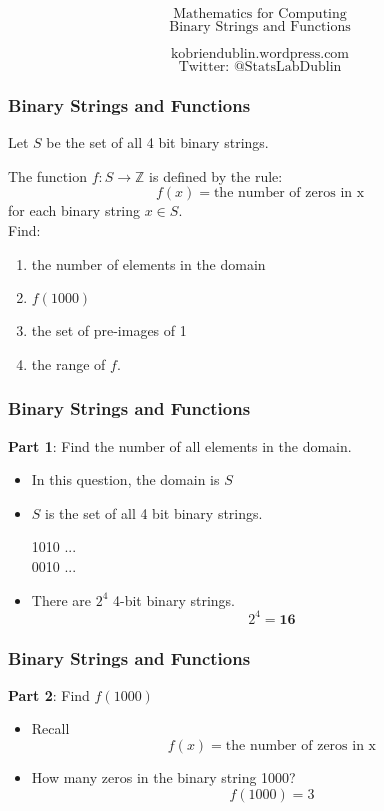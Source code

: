 \documentclass{beamer}
\begin{document}
\begin{frame}
\Huge
\[ \mbox{Mathematics for Computing} \]
\huge
\[ \mbox{Binary Strings and Functions} \]

\Large
\[ \mbox{kobriendublin.wordpress.com} \]
\[ \mbox{Twitter: @StatsLabDublin} \]

\end{frame}
\begin{frame}
\frametitle{Binary Strings and Functions}
\Large
Let $S$ be the set of all 4 bit binary strings. 

The function $f : S \rightarrow \mathbb{Z}$
is defined by the rule:
\[f(x) = \mbox{the number of zeros in x}\]
for each binary string $x \in S$.\\
Find:
\begin{enumerate}
\item the number of elements in the domain
\item $f(1000)$
\item the set of pre-images of 1
\item the range of $f$.
\end{enumerate}

\end{frame}
\begin{frame}
\frametitle{Binary Strings and Functions}
\Large
\vspace{-1cm}
\textbf{Part 1}: Find the number of all elements in the domain.\\


\begin{itemize}
\item In this question, the domain is $S$
\item $S$ is the set of all 4 bit binary strings. 
\begin{center}
{
\LARGE
1010  \; ... \\
0010  \; ... \\
}
\end{center}
\item There are $2^4$ 4-bit binary strings.
\[ 2^4 = \boldsymbol{16}\]
\end{itemize}
\end{frame}
\begin{frame}
\frametitle{Binary Strings and Functions}
\Large
\vspace{-1cm}
\textbf{Part 2}: Find $f(1000)$

\begin{itemize}
\item Recall
\[f(x) = \mbox{the number of zeros in x}\]
\item How many zeros in the binary string 1000? 
\[f(1000) =3\]
\end{itemize}


\end{frame}
\end{document}
